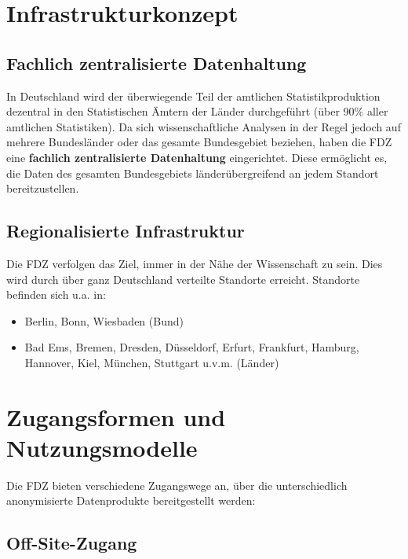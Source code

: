 \documentclass[
  ngerman,
  10pt,
  letterpaper,
  twocolumn]{book}
\providecommand{\tightlist}{%
  \setlength{\itemsep}{0pt}\setlength{\parskip}{0pt}}
\begin{document}
\section{Infrastrukturkonzept}\label{infrastrukturkonzept}

\subsection{Fachlich zentralisierte
Datenhaltung}\label{fachlich-zentralisierte-datenhaltung}

In Deutschland wird der überwiegende Teil der amtlichen
Statistikproduktion dezentral in den Statistischen Ämtern der Länder
durchgeführt (über 90\% aller amtlichen Statistiken). Da sich
wissenschaftliche Analysen in der Regel jedoch auf mehrere Bundesländer
oder das gesamte Bundesgebiet beziehen, haben die FDZ eine
\textbf{fachlich zentralisierte Datenhaltung} eingerichtet. Diese
ermöglicht es, die Daten des gesamten Bundesgebiets länderübergreifend
an jedem Standort bereitzustellen.

\subsection{Regionalisierte
Infrastruktur}\label{regionalisierte-infrastruktur}

Die FDZ verfolgen das Ziel, immer in der Nähe der Wissenschaft zu sein.
Dies wird durch über ganz Deutschland verteilte Standorte erreicht.
Standorte befinden sich u.a. in:

\begin{itemize}
\tightlist
\item
  Berlin, Bonn, Wiesbaden (Bund)
\item
  Bad Ems, Bremen, Dresden, Düsseldorf, Erfurt, Frankfurt, Hamburg,
  Hannover, Kiel, München, Stuttgart u.v.m. (Länder)
\end{itemize}

\section{Zugangsformen und
Nutzungsmodelle}\label{zugangsformen-und-nutzungsmodelle}

Die FDZ bieten verschiedene Zugangswege an, über die unterschiedlich
anonymisierte Datenprodukte bereitgestellt werden:

\subsection{Off-Site-Zugang}\label{off-site-zugang}
\end{document}
